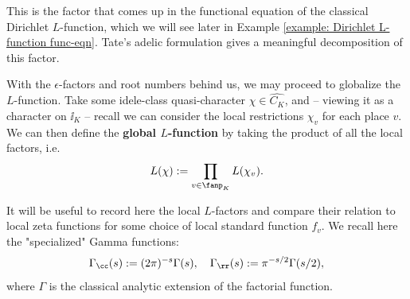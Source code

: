 \documentclass[11pt, x11names, openany]{book}
\begin{document}
This is the factor that comes up in the functional equation of the classical Dirichlet $L$-function, which we will see later in Example \ref{example: Dirichlet L-function func-eqn}. Tate's adelic formulation gives a meaningful decomposition of this factor.

With the $\epsilon$-factors and root numbers behind us, we may proceed to globalize the $L$-function. Take some idele-class quasi-character $\chi \in \hat{C_K}$, and -- viewing it as a character on $\ii_K$ -- recall we can consider the local restrictions $\chi_v$ for each place $v$. We can then define the \textbf{global $L$-function} by taking the product of all the local factors, i.e.
\begin{equation}
    \label{eqn: global L-function}
    L(\chi) := \prod_{v \in \fanp_K} L(\chi_v).
\end{equation}

It will be useful to record here the local $L$-factors and compare their relation to local zeta functions for some choice of local standard function $f_v$. We recall here the "specialized" Gamma functions:
\begin{equation*}
    \Gamma_\cc(s) := (2\pi)^{-s} \Gamma(s), \quad \Gamma_\rr(s) := \pi^{-s/2} \Gamma(s/2),
\end{equation*}
where $\Gamma$ is the classical analytic extension of the factorial function.
\end{document}
